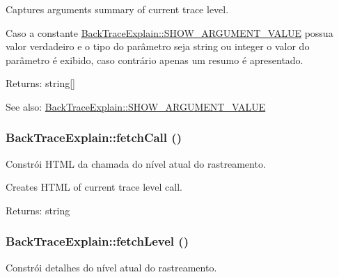 Captures arguments summary of current trace level.

Caso a constante \hyperlink{class_back_trace_explain_c588570f668add1f67e691c222c227b8}{BackTraceExplain::SHOW\_\-ARGUMENT\_\-VALUE} possua valor verdadeiro e o tipo do parâmetro seja string ou integer o valor do parâmetro é exibido, caso contrário apenas um resumo é apresentado.

\begin{Desc}
\item[Returns:]string\mbox{[}\mbox{]} \end{Desc}
\begin{Desc}
\item[See also:]\hyperlink{class_back_trace_explain_c588570f668add1f67e691c222c227b8}{BackTraceExplain::SHOW\_\-ARGUMENT\_\-VALUE} \end{Desc}
\hypertarget{class_back_trace_explain_485a5d60f6cdb95bb96f58299142e2a4}{
\subsubsection[{fetchCall}]{\setlength{\rightskip}{0pt plus 5cm}BackTraceExplain::fetchCall ()}}
\label{class_back_trace_explain_485a5d60f6cdb95bb96f58299142e2a4}


Constrói HTML da chamada do nível atual do rastreamento.

Creates HTML of current trace level call.

\begin{Desc}
\item[Returns:]string \end{Desc}
\hypertarget{class_back_trace_explain_eca7af75c0df67f42d8f8fbbc910c1f5}{
\subsubsection[{fetchLevel}]{\setlength{\rightskip}{0pt plus 5cm}BackTraceExplain::fetchLevel ()}}
\label{class_back_trace_explain_eca7af75c0df67f42d8f8fbbc910c1f5}


Constrói detalhes do nível atual do rastreamento.

